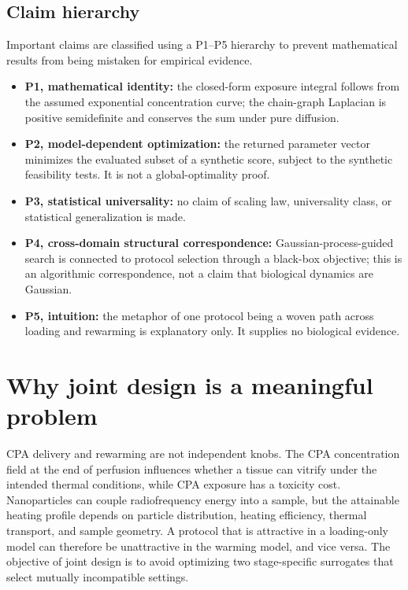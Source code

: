 \documentclass[11pt]{article}
\begin{document}
\subsection{Claim hierarchy}
Important claims are classified using a P1--P5 hierarchy to prevent mathematical results from being mistaken for empirical evidence.
\begin{itemize}
\item \textbf{P1, mathematical identity:} the closed-form exposure integral follows from the assumed exponential concentration curve; the chain-graph Laplacian is positive semidefinite and conserves the sum under pure diffusion.
\item \textbf{P2, model-dependent optimization:} the returned parameter vector minimizes the evaluated subset of a synthetic score, subject to the synthetic feasibility tests. It is not a global-optimality proof.
\item \textbf{P3, statistical universality:} no claim of scaling law, universality class, or statistical generalization is made.
\item \textbf{P4, cross-domain structural correspondence:} Gaussian-process-guided search is connected to protocol selection through a black-box objective; this is an algorithmic correspondence, not a claim that biological dynamics are Gaussian.
\item \textbf{P5, intuition:} the metaphor of one protocol being a woven path across loading and rewarming is explanatory only. It supplies no biological evidence.
\end{itemize}

\section{Why joint design is a meaningful problem}

CPA delivery and rewarming are not independent knobs. The CPA concentration field at the end of perfusion influences whether a tissue can vitrify under the intended thermal conditions, while CPA exposure has a toxicity cost. Nanoparticles can couple radiofrequency energy into a sample, but the attainable heating profile depends on particle distribution, heating efficiency, thermal transport, and sample geometry. A protocol that is attractive in a loading-only model can therefore be unattractive in the warming model, and vice versa. The objective of joint design is to avoid optimizing two stage-specific surrogates that select mutually incompatible settings.
\end{document}
